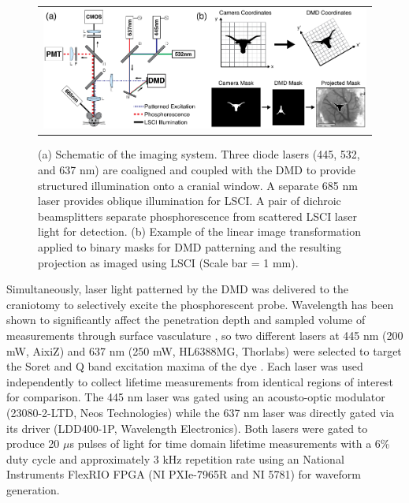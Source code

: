 \documentclass[12pt]{spieman}  %
\begin{document}
\begin{spacing}{2}
\begin{figure}
    \begin{center}
        \begin{tabular}{c}
            \includegraphics[width=6.25in]{Figure1.pdf}
        \end{tabular}
    \end{center}
    \caption {
        \label{fig:system_schematic}
        (a) Schematic of the imaging system. Three diode lasers (445, 532, and 637 nm) are coaligned and coupled with the DMD to provide structured illumination onto a cranial window. A separate 685 nm laser provides oblique illumination for LSCI. A pair of dichroic beamsplitters separate phosphorescence from scattered LSCI laser light for detection. (b) Example of the linear image transformation applied to binary masks for DMD patterning and the resulting projection as imaged using LSCI (Scale bar = 1 mm).
    }
\end{figure}

Simultaneously, laser light patterned by the DMD was delivered to the craniotomy to selectively excite the phosphorescent probe. Wavelength has been shown to significantly affect the penetration depth and sampled volume of measurements through surface vasculature \cite{Davis:2011wj}, so two different lasers at 445 nm (200 mW, AixiZ) and 637 nm (250 mW, HL6388MG, Thorlabs) were selected to target the Soret and Q band excitation maxima of the dye \cite{Esipova:2011hi}. Each laser was used independently to collect lifetime measurements from identical regions of interest for comparison. The 445 nm laser was gated using an acousto-optic modulator (23080-2-LTD, Neos Technologies) while the 637 nm laser was directly gated via its driver (LDD400-1P, Wavelength Electronics). Both lasers were gated to produce 20 $\mu$s pulses of light for time domain lifetime measurements with a 6\% duty cycle and approximately 3 kHz repetition rate using an National Instruments FlexRIO FPGA (NI PXIe-7965R and NI 5781) for waveform generation.


\end{spacing}
\end{document}

